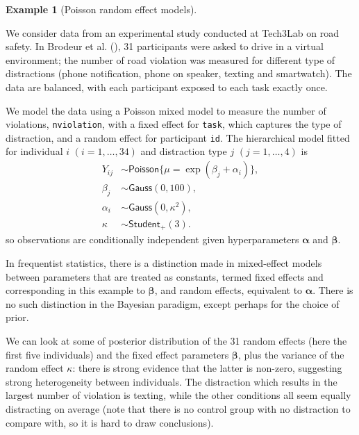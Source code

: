 \documentclass[
  11pt,
  letterpaper,
]{scrbook}
\theoremstyle{definition}
\theoremstyle{definition}
\newtheorem{example}{Example}[chapter]
\theoremstyle{definition}
\theoremstyle{plain}
\theoremstyle{plain}
\theoremstyle{remark}
\begin{document}
\begin{example}[Poisson random effect
models]\protect\hypertarget{exm-randomeffects}{}\label{exm-randomeffects}

We consider data from an experimental study conducted at Tech3Lab on
road safety. In Brodeur et al. (), 31
participants were asked to drive in a virtual environment; the number of
road violation was measured for different type of distractions (phone
notification, phone on speaker, texting and smartwatch). The data are
balanced, with each participant exposed to each task exactly once.

We model the data using a Poisson mixed model to measure the number of
violations, \texttt{nviolation}, with a fixed effect for \texttt{task},
which captures the type of distraction, and a random effect for
participant \texttt{id}. The hierarchical model fitted for individual
\(i\) \((i=1, \ldots, 34)\) and distraction type \(j\)
\((j=1, \ldots, 4)\) is \begin{align*}
Y_{ij} &\sim \mathsf{Poisson}\{\mu = \exp(\beta_{j} + \alpha_i)\},\\
\beta_j &\sim \mathsf{Gauss}(0, 100), \\
\alpha_i &\sim \mathsf{Gauss}(0, \kappa^2), \\
\kappa &\sim \mathsf{Student}_{+}(3).
\end{align*} so observations are conditionally independent given
hyperparameters \(\boldsymbol{\alpha}\) and \(\boldsymbol{\beta}\).

In frequentist statistics, there is a distinction made in mixed-effect
models between parameters that are treated as constants, termed fixed
effects and corresponding in this example to \(\boldsymbol{\beta}\), and
random effects, equivalent to \(\boldsymbol{\alpha}\). There is no such
distinction in the Bayesian paradigm, except perhaps for the choice of
prior.

We can look at some of posterior distribution of the 31 random effects
(here the first five individuals) and the fixed effect parameters
\(\boldsymbol{\beta}\), plus the variance of the random effect
\(\kappa\): there is strong evidence that the latter is non-zero,
suggesting strong heterogeneity between individuals. The distraction
which results in the largest number of violation is texting, while the
other conditions all seem equally distracting on average (note that
there is no control group with no distraction to compare with, so it is
hard to draw conclusions).


\end{example}
\end{document}
